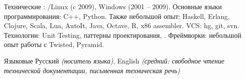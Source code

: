 \documentclass[unicode, 10pt, a4paper, oneside, fleqn]{article}
\begin{document}
\spacedhrule{0.5em}{-0.4em}


\inlineheadsection  %
  {Технические}
  {: /Linux (c 2009), Windows (2001 -- 2009).
   Основные языки программирования: C++, Python.
   Также небольшой опыт: Haskell, Erlang, Clojure, Scala, Lua, AutoIt,
   Java, Octave, R, x86 assembler.
   VCS: hg, git, svn.
   Технологии: Unit Testing, паттерны проектирования, .
   Фреймворки: небольшой опыт работы с Twisted, Pyramid.
  }

\inlineheadsection
  {Языковые}
  {Русский \emph{(носитель языка)}, English \emph{(средний: свободное чтение
   технической документации, письменная техническая речь)}}

%
%
\end{document}
